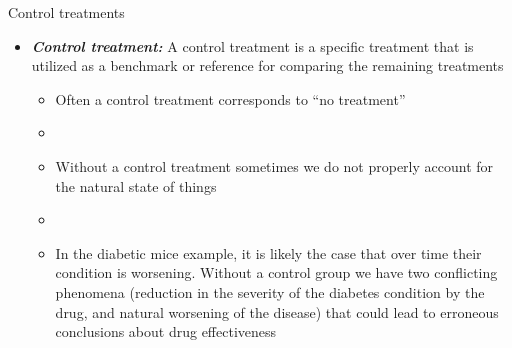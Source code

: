 \documentclass[xcolor=dvipsnames]{beamer}
\begin{document}
\begin{frame}{Control treatments}
	\begin{itemize}
		\item \textbf{\emph{Control treatment:}} A control treatment is a specific treatment that is utilized as a benchmark or reference for comparing the remaining treatments
		\begin{itemize}
			\item Often a control treatment corresponds to ``no treatment''
			\item[]
			\item Without a control treatment sometimes we do not properly account for the natural state of things
			\item[]
			\item In the diabetic mice example, it is likely the case that over time their condition is worsening. Without a control group we have two conflicting phenomena (reduction in the severity of the diabetes condition by the drug, and natural worsening of the disease) that could lead to erroneous conclusions about drug effectiveness
		\end{itemize}
		
	\end{itemize}
\end{frame}
\end{document}
